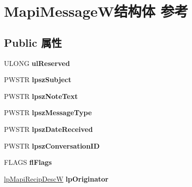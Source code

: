 \hypertarget{struct_mapi_message_w}{}\section{Mapi\+Message\+W结构体 参考}
\label{struct_mapi_message_w}
\subsection*{Public 属性}
\begin{DoxyCompactItemize}
\item 
\mbox{\label{struct_mapi_message_w_ac68fa18f5c4e50693700055d56611854}} 
U\+L\+O\+NG {\bfseries ul\+Reserved}
\item 
\mbox{\label{struct_mapi_message_w_adb76eb36e90ef29e59889cc553bbd9b9}} 
P\+W\+S\+TR {\bfseries lpsz\+Subject}
\item 
\mbox{\label{struct_mapi_message_w_abdc35a773389292c209bef57e01464fa}} 
P\+W\+S\+TR {\bfseries lpsz\+Note\+Text}
\item 
\mbox{\label{struct_mapi_message_w_a71570abdcfa8de0c2783d7c885461d89}} 
P\+W\+S\+TR {\bfseries lpsz\+Message\+Type}
\item 
\mbox{\label{struct_mapi_message_w_a2b47bf95350fb9550a259968174f5974}} 
P\+W\+S\+TR {\bfseries lpsz\+Date\+Received}
\item 
\mbox{\label{struct_mapi_message_w_ac149eb6e69cda06aea2fb5e6685d38af}} 
P\+W\+S\+TR {\bfseries lpsz\+Conversation\+ID}
\item 
\mbox{\label{struct_mapi_message_w_aea10cb9b1f291942b7ef719a9948dcef}} 
F\+L\+A\+GS {\bfseries fl\+Flags}
\item 
\mbox{\label{struct_mapi_message_w_a414d623118d9e68b278b388f266b2e92}} 
\hyperlink{struct_mapi_recip_desc_w}{lp\+Mapi\+Recip\+DescW} {\bfseries lp\+Originator}
\item 
\mbox{\label{struct_mapi_message_w_ab8f847d6633a0a2ae4f0861f6a70b2e7}} 

\end{DoxyCompactItemize}
